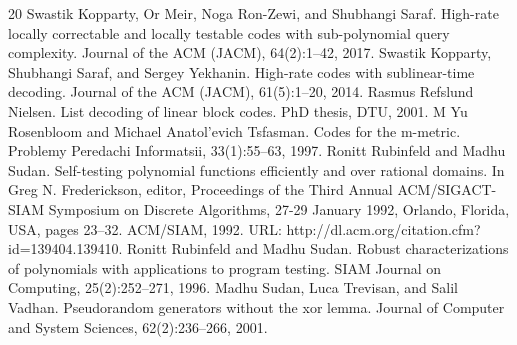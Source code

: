 \documentclass[10pt,a4paper]{article}
\begin{document}
\begin{thebibliography}{20}
 Swastik Kopparty, Or Meir, Noga Ron-Zewi, and Shubhangi Saraf. High-rate locally correctable and locally testable codes with sub-polynomial query complexity. Journal of the ACM (JACM), 64(2):1–42, 2017.
 Swastik Kopparty, Shubhangi Saraf, and Sergey Yekhanin. High-rate codes with sublinear-time decoding. Journal of the ACM (JACM), 61(5):1–20, 2014.
 Rasmus Refslund Nielsen. List decoding of linear block codes. PhD thesis, DTU, 2001.
 M Yu Rosenbloom and Michael Anatol’evich Tsfasman. Codes for the m-metric. Problemy Peredachi Informatsii, 33(1):55–63, 1997.
 Ronitt Rubinfeld and Madhu Sudan. Self-testing polynomial functions efficiently and over rational domains. In Greg N. Frederickson, editor, Proceedings of the Third Annual ACM/SIGACT-SIAM Symposium on Discrete Algorithms, 27-29 January 1992, Orlando, Florida, USA, pages 23–32. ACM/SIAM, 1992. URL: http://dl.acm.org/citation.cfm?id=139404.139410.
 Ronitt Rubinfeld and Madhu Sudan. Robust characterizations of polynomials with applications to program testing. SIAM Journal on Computing, 25(2):252–271, 1996.
 Madhu Sudan, Luca Trevisan, and Salil Vadhan. Pseudorandom generators without the xor lemma. Journal of Computer and System Sciences, 62(2):236–266, 2001.
\end{thebibliography}
\end{document}
